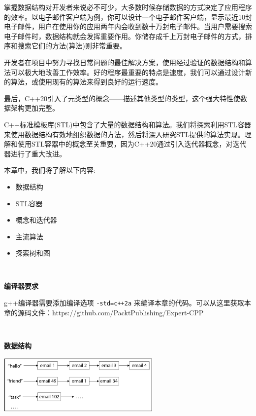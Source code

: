 掌握数据结构对开发者来说必不可少，大多数时候存储数据的方式决定了应用程序的效率。以电子邮件客户端为例，你可以设计一个电子邮件客户端，显示最近10封电子邮件，用户在使用你的应用两年内会收到数十万封电子邮件。当用户需要搜索电子邮件时，数据结构就会发挥重要作用。你储存成千上万封电子邮件的方式，排序和搜索它们的方法(算法)则非常重要。 \par
开发者在项目中努力寻找日常问题的最佳解决方案，使用经过验证的数据结构和算法可以极大地改善工作效率。好的程序最重要的特点是速度，我们可以通过设计新的算法，或使用现有的算法来得到良好的运行速度。 \par
最后，C++20引入了元类型的概念——描述其他类型的类型，这个强大特性使数据架构更加完整。 \par
C++标准模板库(STL)中包含了大量的数据结构和算法。我们将探索利用STL容器来使用数据结构有效地组织数据的方法，然后将深入研究STL提供的算法实现。理解和使用STL容器中的概念至关重要，因为C++20通过引入迭代器概念，对迭代器进行了重大改进。 \par
本章中，我们将了解以下内容: \par

\begin{itemize}
	\item 数据结构
	\item STL容器
	\item 概念和迭代器
	\item 主流算法
	\item 探索树和图
\end{itemize}

\noindent\textbf{}\ \par
\textbf{编译器要求} \ \par
g++编译器需要添加编译选项 \texttt{-std=c++2a} 来编译本章的代码。可以从这里获取本章的源码文件：https:/​/github.​com/PacktPublishing/Expert-CPP \par

\noindent\textbf{}\ \par
\textbf{数据结构} \ \par

\begin{center}
	\includegraphics[width=0.6\textwidth]{content/Section-2/Chapter-6/1}
\end{center}


